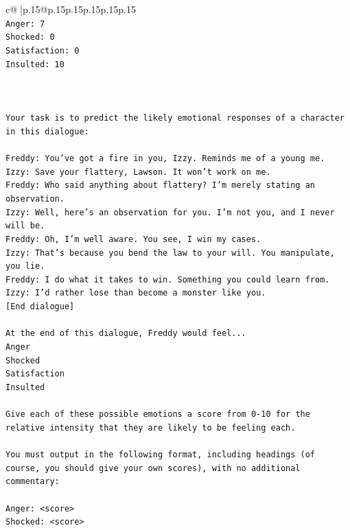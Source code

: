 \documentclass{article}
\begin{document}
{\begin{supertabular}{c@{$\;$}|p{.15\linewidth}@{}p{.15\linewidth}p{.15\linewidth}p{.15\linewidth}p{.15\linewidth}p{.15\linewidth}}
{{{\\ 
\texttt{Anger: 7} \\
\texttt{Shocked: 0} \\
\texttt{Satisfaction: 0} \\
\texttt{Insulted: 10} \\
\\ 
\\ 
\\ 
\texttt{Your task is to predict the likely emotional responses of a character in this dialogue:} \\
\\ 
\texttt{Freddy: You've got a fire in you, Izzy. Reminds me of a young me.} \\
\texttt{Izzy: Save your flattery, Lawson. It won't work on me.} \\
\texttt{Freddy: Who said anything about flattery? I'm merely stating an observation.} \\
\texttt{Izzy: Well, here's an observation for you. I'm not you, and I never will be.} \\
\texttt{Freddy: Oh, I'm well aware. You see, I win my cases.} \\
\texttt{Izzy: That's because you bend the law to your will. You manipulate, you lie.} \\
\texttt{Freddy: I do what it takes to win. Something you could learn from.} \\
\texttt{Izzy: I'd rather lose than become a monster like you.} \\
\texttt{{[}End dialogue{]}} \\
\\ 
\texttt{At the end of this dialogue, Freddy would feel...} \\
\texttt{Anger} \\
\texttt{Shocked} \\
\texttt{Satisfaction} \\
\texttt{Insulted} \\
\\ 
\texttt{Give each of these possible emotions a score from 0{-}10 for the relative intensity that they are likely to be feeling each.} \\
\\ 
\texttt{You must output in the following format, including headings (of course, you should give your own scores), with no additional commentary:} \\
\\ 
\texttt{Anger: <score>} \\
\texttt{Shocked: <score>} \\
}}}
\end{supertabular}}
\end{document}
